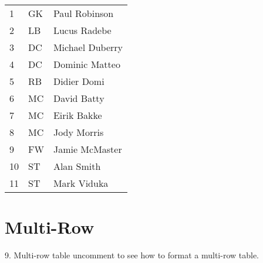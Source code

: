 \documentclass{article}
\begin{document}
\begin{tabular}{|l|l|l|}
  \hline
  \hline
  1 & GK & Paul Robinson \\
  2 & LB & Lucus Radebe \\
  3 & DC & Michael Duberry \\
  4 & DC & Dominic Matteo \\
  5 & RB & Didier Domi \\
  6 & MC & David Batty \\
  7 & MC & Eirik Bakke \\
  8 & MC & Jody Morris \\
  9 & FW & Jamie McMaster \\
  10 & ST & Alan Smith \\
  11 & ST & Mark Viduka \\
  \hline
\end{tabular}

\section{Multi-Row}

9. Multi-row table uncomment to see how to format a multi-row table.
\end{document}
